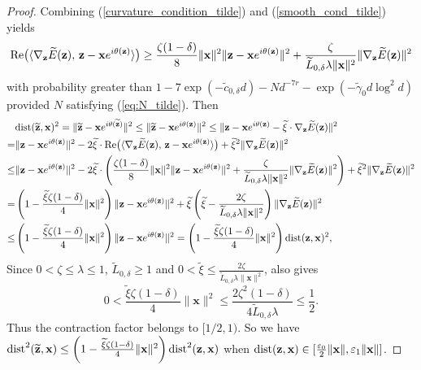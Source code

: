 \documentclass{article}
\renewcommand{\eqref}[1]{(\ref{#1})}
\newcommand{\re}{{\rm Re}}
\newcommand{\dist}{{\rm dist}}
\newcommand{\vx}{{\mathbf x}}
\newcommand{\vz}{{\mathbf z}}
\newcommand{\0}{{\mathbf 0}}
\numberwithin{equation}{section}
\begin{document}
\begin{proof}
		\noindent
		Combining \eqref{curvature_condition_tilde} and \eqref{smooth_cond_tilde} yields
		\[
		\re\big(\langle\nabla_{\vz} \widetilde E(\vz),\,\vz-\vx e^{i\theta(\vz)}\rangle\big)\geq\frac{\zeta(1-\delta)}{8}\|\vx\|^2\|\vz-\vx e^{i\theta(\vz)}\|^2+\frac{\zeta}{\widetilde L_{0,\delta}\lambda\|\vx\|^2}\|\nabla_{\vz} \widetilde E(\vz)\|^2
		\]
		with probability greater than  $1-7\exp(-\widetilde c_{0,\delta} d)- Nd^{-7r}
		-\exp(-\widetilde \gamma_0 d\log^2 d)$ provided $N$ satisfying \eqref{eq:N_tilde}.  
		\noindent
		Then 
		\begin{align*}
			&\dist(\widetilde\vz,\vx)^2=\|\widetilde\vz-\vx e^{i\theta(\widetilde\vz)}\|^2
			\le\|\widetilde\vz-\vx e^{i\theta(\vz)}\|^2
			\le\|\vz-\vx e^{i\theta(\vz)}-\widetilde\xi\cdot\nabla_{\vz} \widetilde E(\vz)\|^2\\
			=&\|\vz-\vx e^{i\theta(\vz)}\|^2-2\widetilde\xi\cdot\re\big(\langle\nabla_{\vz} \widetilde E(\vz),\,\vz-\vx e^{i\theta(\vz)}\rangle\big)+\widetilde\xi^2\|\nabla_{\vz} \widetilde E(\vz)\|^2\\
			\le&\|\vz-\vx e^{i\theta(\vz)}\|^2-2\widetilde\xi\cdot\Bigg(\frac{\zeta(1-\delta)}{8}\|\vx\|^2\|\vz-\vx e^{i\theta(\vz)}\|^2+\frac{\zeta}{\widetilde L_{0,\delta}\lambda\|\vx\|^2}\|\nabla_{\vz} \widetilde E(\vz)\|^2\Bigg)+\widetilde\xi^2\|\nabla_{\vz}\widetilde E(\vz)\|^2\\
			=&\left(1-\frac{\widetilde\xi\zeta(1-\delta)}{4}\|\vx\|^2\right)\|\vz-\vx e^{i\theta(\vz)}\|^2+\widetilde\xi\left(\widetilde\xi-\frac{2\zeta}{\widetilde L_{0,\delta}\lambda\|\vx\|^2}\right)\|\nabla_{\vz}\widetilde E(\vz)\|^2\\
			\leq&\left(1-\frac{\widetilde\xi\zeta(1-\delta)}{4}\|\vx\|^2\right)\|\vz-\vx e^{i\theta(\vz)}\|^2=\left(1-\frac{\widetilde\xi\zeta(1-\delta)}{4}\|\vx\|^2\right)\dist(\vz,\vx)^2,
		\end{align*}
		Since $0<\zeta\le\lambda\le1$, $\widetilde L_{0,\delta}\ge1$ and $0<\widetilde\xi\le \frac{2\zeta}{\widetilde L_{0,\delta}\lambda\|\vx\|^2}$, also gives
		\[
		0<\frac{\widetilde\xi\zeta(1-\delta)}4\|\vx\|^2
		\le\frac{2\zeta^2(1-\delta)}{4\widetilde L_{0,\delta}\lambda}
		\le\frac1{2}.
		\]
		Thus the contraction factor belongs to $[1/2,1)$.
		So we have $\dist^2(\widetilde\vz,\vx)\le\left(1-\frac{\widetilde\xi\zeta(1-\delta)}{4}\|\vx\|^2\right)\dist^2(\vz,\vx)$ when
		$\dist(\vz,\vx)\in[\frac{\varepsilon_0}2\|\vx\|,\varepsilon_1\|\vx\|]$.
	\end{proof}
\end{document}
